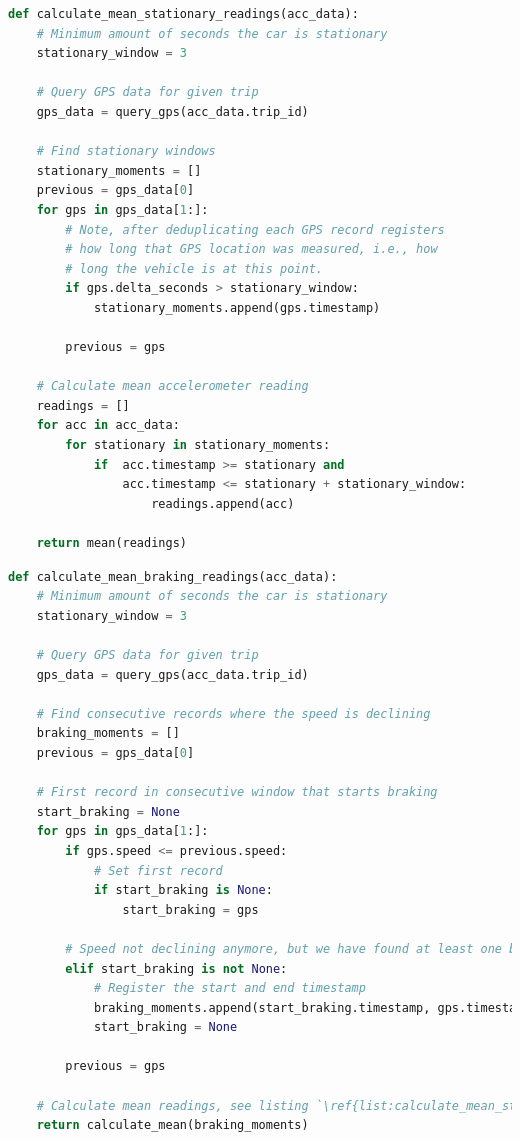 \begin{minipage}{.95\textwidth}
\begin{lstlisting}[language=Python, caption={Pseudo implementation of calculating stationary readings.}, label={list:calculate_mean_stationary_readings}]
def calculate_mean_stationary_readings(acc_data):
    # Minimum amount of seconds the car is stationary
    stationary_window = 3

    # Query GPS data for given trip
    gps_data = query_gps(acc_data.trip_id) 
    
    # Find stationary windows
    stationary_moments = []
    previous = gps_data[0]
    for gps in gps_data[1:]:
        # Note, after deduplicating each GPS record registers
        # how long that GPS location was measured, i.e., how
        # long the vehicle is at this point.
        if gps.delta_seconds > stationary_window:
            stationary_moments.append(gps.timestamp)
        
        previous = gps
            
    # Calculate mean accelerometer reading
    readings = []
    for acc in acc_data:
        for stationary in stationary_moments:
            if  acc.timestamp >= stationary and 
                acc.timestamp <= stationary + stationary_window:
                    readings.append(acc)
    
    return mean(readings)
\end{lstlisting}
\end{minipage}

\begin{minipage}{.95\textwidth}
\begin{lstlisting}[language=Python, caption={Pseudo implementation of calculating mean readings while the vehicle is braking.}, label={list:calculate_mean_braking_readings}]
def calculate_mean_braking_readings(acc_data):
    # Minimum amount of seconds the car is stationary
    stationary_window = 3

    # Query GPS data for given trip
    gps_data = query_gps(acc_data.trip_id) 
    
    # Find consecutive records where the speed is declining
    braking_moments = []
    previous = gps_data[0]
    
    # First record in consecutive window that starts braking
    start_braking = None
    for gps in gps_data[1:]:
        if gps.speed <= previous.speed:
            # Set first record 
            if start_braking is None:
                start_braking = gps
        
        # Speed not declining anymore, but we have found at least one braking record
        elif start_braking is not None:
            # Register the start and end timestamp
            braking_moments.append(start_braking.timestamp, gps.timestamp)
            start_braking = None
            
        previous = gps
            
    # Calculate mean readings, see listing `\ref{list:calculate_mean_stationary_readings}`
    return calculate_mean(braking_moments)
\end{lstlisting}
\end{minipage}

